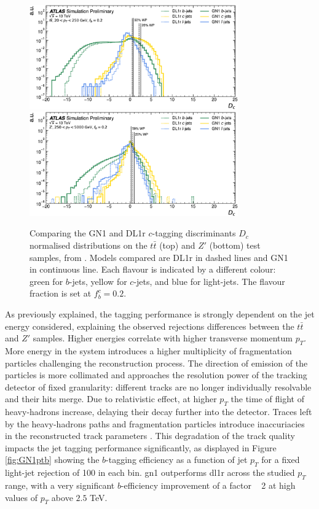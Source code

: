 \begin{figure}[h!]
  \centering
  \includegraphics[width=0.8\textwidth]{Images/FTAG/GN/GN1/eff/ttc.png}
  \includegraphics[width=0.8\textwidth]{Images/FTAG/GN/GN1/eff/zpc.png}
  \caption{Comparing the GN1 and DL1r $c$-tagging discriminants $D_c$ normalised distributions on the $t\bar{t}$ (top) and $Z'$ (bottom) test samples, from \cite{ATL-PHYS-PUB-2022-027}. Models compared are DL1r in dashed lines and GN1 in continuous line. Each flavour is indicated by a different colour: green for $b$-jets, yellow for $c$-jets, and blue for light-jets. The flavour fraction is set at $f^c_b = 0.2$.}
  \label{fig:GN1disc}
\end{figure} 

As previously explained, the tagging performance is strongly dependent on the jet energy considered, explaining the observed rejections differences between the $t\bar{t}$ and $Z'$ samples. Higher energies correlate with higher transverse momentum $p_T$. More energy in the system introduces a higher multiplicity of fragmentation particles challenging the reconstruction process. The direction of emission of the particles is more collimated and approaches the resolution power of the tracking detector of fixed granularity: different tracks are no longer individually resolvable and their hits merge. Due to relativistic effect, at higher $p_T$ the time of flight of heavy-hadrons increase, delaying their decay further into the detector. Traces left by the heavy-hadrons paths and fragmentation particles introduce inaccuriacies in the reconstructed track parameters \cite{ATLAS-tracks-algo}. This degradation of the track quality impacts the jet tagging performance significantly, as displayed in Figure \ref{fig:GN1ptb} showing the $b$-tagging efficiency as a function of jet $p_T$ for a fixed light-jet rejection of 100 in each bin. \gls{gn1} outperforms \gls{dl1r} across the studied $p_T$ range, with a very significant $b$-efficiency improvement of a factor ~ 2 at high values of $p_T$ above $2.5$ TeV. 

